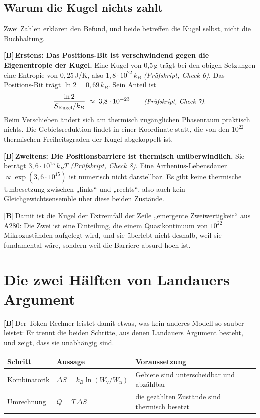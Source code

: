\documentclass[11pt,a4paper]{article}
\newcommand{\LB}{\textcolor{layB}{\textbf{\footnotesize\textsf{[B]}}}\,}
\newcommand{\pruef}[1]{{\small\itshape(Prüfskript, #1)}}
\begin{document}
\subsection{Warum die Kugel nichts zahlt}

Zwei Zahlen erklären den Befund, und beide betreffen die Kugel selbst, nicht die
Buchhaltung.

\LB \textbf{Erstens: Das Positions-Bit ist verschwindend gegen die Eigenentropie
der Kugel.} Eine Kugel von 0,5\,g trägt bei den obigen Setzungen eine Entropie von
$0{,}25$\,J/K, also $1{,}8\cdot10^{22}\,k_B$ \pruef{Check 6}. Das Positions-Bit
trägt $\ln 2 = 0{,}69\,k_B$. Sein Anteil ist
\begin{equation}
  \frac{\ln 2}{S_{\text{Kugel}}/k_B} \;\approx\; 3{,}8\cdot10^{-23}
  \qquad \text{\pruef{Check 7}} .
\end{equation}
Beim Verschieben ändert sich am thermisch zugänglichen Phasenraum praktisch
nichts. Die Gebietsreduktion findet in einer Koordinate statt, die von den
$10^{22}$ thermischen Freiheitsgraden der Kugel abgekoppelt ist.

\LB \textbf{Zweitens: Die Positionsbarriere ist thermisch unüberwindlich.} Sie
beträgt $3{,}6\cdot10^{15}\,k_BT$ \pruef{Check 8}. Eine Arrhenius-Lebensdauer
$\propto \exp(3{,}6\cdot10^{15})$ ist numerisch nicht darstellbar. Es gibt keine
thermische Umbesetzung zwischen „links“ und „rechts“, also auch kein
Gleichgewichtsensemble über diese beiden Zustände.

\LB Damit ist die Kugel der Extremfall der Zeile „emergente Zweiwertigkeit“ aus
A280: Die Zwei ist eine Einteilung, die einem Quasikontinuum von $10^{22}$
Mikrozuständen aufgelegt wird, und sie überlebt nicht deshalb, weil sie
fundamental wäre, sondern weil die Barriere absurd hoch ist.

\section{Die zwei Hälften von Landauers Argument}
\label{sec:zweihaelften}

\LB Der Token-Rechner leistet damit etwas, was kein anderes Modell so sauber
leistet: Er trennt die beiden Schritte, aus denen Landauers Argument besteht, und
zeigt, dass sie unabhängig sind.

\begin{center}
\small
\begin{tabular}{@{}p{}p{}p{}@{}}
\toprule
\textbf{Schritt} & \textbf{Aussage} & \textbf{Voraussetzung} \\
\midrule
Kombinatorik & $\Delta S = k_B \ln(W_{\text{v}}/W_{\text{n}})$ &
Gebiete sind unterscheidbar und abzählbar \\
Umrechnung & $Q = T\,\Delta S$ &
die gezählten Zustände sind thermisch besetzt \\
\bottomrule
\end{tabular}
\end{center}
\end{document}

